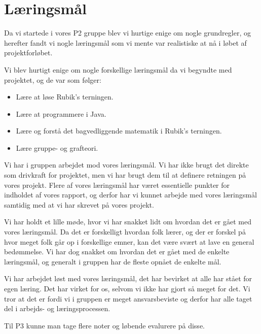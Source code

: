 \section{L\ae{}ringsm\aa{}l}
Da vi startede i vores P2 gruppe blev vi hurtige enige om nogle grundregler, og herefter fandt vi nogle l\ae{}ringsm\aa{}l som vi mente var realistiske at n\aa{} i l\o{}bet af projektforl\o{}bet.

Vi blev hurtigt enige om nogle forskellige l\ae{}ringsm\aa{}l da vi begyndte med projektet, og de var som f\o{}lger:

\begin{itemize}
\item L\ae{}re at l\o{}se Rubik's terningen.
\item L\ae{}re at programmere i Java.
\item L\ae{}re  og forst\aa{} det bagvedliggende matematik i Rubik's terningen. 
\item L\ae{}re gruppe- og grafteori.
\end{itemize}

Vi har i gruppen arbejdet mod vores l\ae{}ringsm\aa{}l.
Vi har ikke brugt det direkte som drivkraft for projektet, men vi har brugt dem til at definere retningen p\aa{} vores projekt.
Flere af vores l\ae{}ringsm\aa{}l har v\ae{}ret essentielle punkter for indholdet af vores rapport, og derfor har vi kunnet arbejde med vores l\ae{}ringsm\aa{}l samtidig med at vi har skrevet p\aa{} vores projekt.

Vi har holdt et lille m\o{}de, hvor vi har snakket lidt om hvordan det er g\aa{}et med vores l\ae{}ringsm\aa{}l. Da det er forskelligt hvordan folk l\ae{}rer, og der er forskel p\aa{} hvor meget folk g\aa{}r op i forskellige emner, kan det v\ae{}re sv\ae{}rt at lave en general bed\o{}mmelse. Vi har dog snakket om hvordan det er g\aa{}et med de enkelte l\ae{}ringsm\aa{}l, og generalt i gruppen har de fleste opn\aa{}et de enkelte m\aa{}l.

Vi har arbejdet l\o{}st med vores l\ae{}ringsm\aa{}l, det har bevirket at alle har st\aa{}et for egen l\ae{}ring. Det har virket for os, selvom vi ikke har gjort s\aa{} meget for det.
Vi tror at det er fordi vi i gruppen er meget ansvarsbeviste og derfor har alle taget del i arbejds- og l\ae{}ringsprocessen.

Til P3 kunne man tage flere noter og l\o{}bende evalurere p\aa{} disse.

